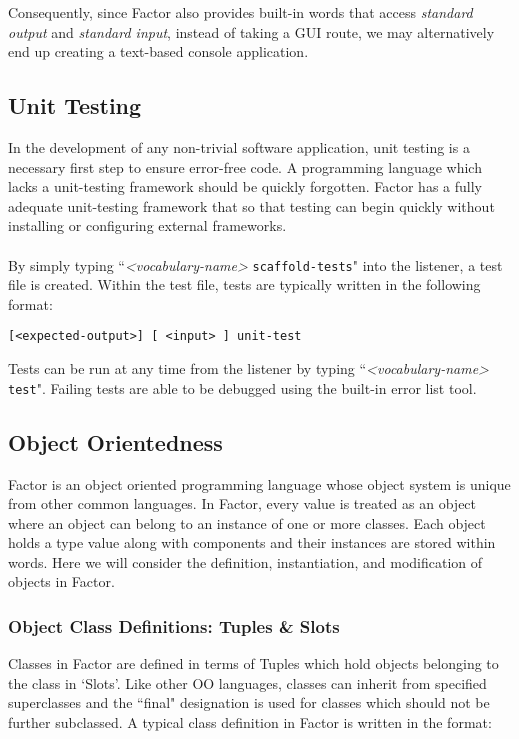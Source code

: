 \documentclass{sig-alternate}
\begin{document}
Consequently, since Factor also provides built-in words that access \textit{standard output} and \textit{standard input}, instead of taking a GUI route, we may alternatively end up creating a text-based console application.

\subsection{Unit Testing}
In the development of any non-trivial software application, unit testing is a necessary first step to ensure error-free code. A programming language which lacks a unit-testing framework should be quickly forgotten. Factor has a fully adequate unit-testing framework that so that testing can begin quickly without installing or configuring external frameworks. 
\\\\
   By simply typing ``\textit{<vocabulary-name>} \texttt{scaffold-tests}" into the listener, a test file is created. Within the test file, tests are typically written in the following format:

\begin{verbatim}
[<expected-output>] [ <input> ] unit-test
\end{verbatim}

Tests can be run at any time from the listener by typing ``\textit{<vocabulary-name>} \texttt{test}". Failing tests are able to be debugged using the built-in error list tool.

\subsection{Object Orientedness}
Factor is an object oriented programming language whose object system is unique from other common languages. In Factor, every value is treated as an object where an object can belong to an instance of one or more classes. Each object holds a type value along with components and their instances are stored within words. Here we will consider the definition, instantiation, and modification of objects in Factor.
 
\subsubsection{Object Class Definitions: Tuples \& Slots}
Classes in Factor are defined in terms of Tuples which hold objects belonging to the class in `Slots'. Like other OO languages, classes can inherit from specified superclasses and the ``final" designation is used for classes which should not be further subclassed. A typical class definition in Factor is written in the format:
\end{document}
